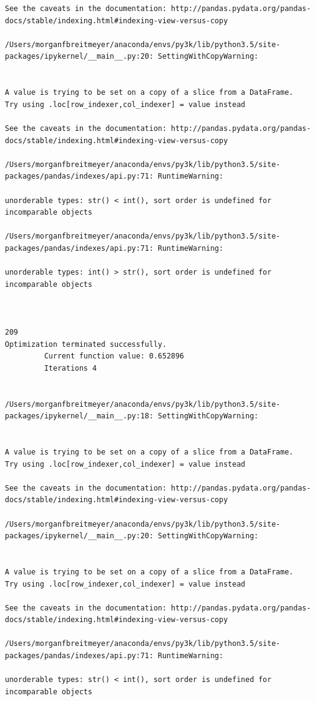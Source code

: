\begin{lstlisting}
See the caveats in the documentation: http://pandas.pydata.org/pandas-docs/stable/indexing.html#indexing-view-versus-copy

/Users/morganfbreitmeyer/anaconda/envs/py3k/lib/python3.5/site-packages/ipykernel/__main__.py:20: SettingWithCopyWarning:


A value is trying to be set on a copy of a slice from a DataFrame.
Try using .loc[row_indexer,col_indexer] = value instead

See the caveats in the documentation: http://pandas.pydata.org/pandas-docs/stable/indexing.html#indexing-view-versus-copy

/Users/morganfbreitmeyer/anaconda/envs/py3k/lib/python3.5/site-packages/pandas/indexes/api.py:71: RuntimeWarning:

unorderable types: str() < int(), sort order is undefined for incomparable objects

/Users/morganfbreitmeyer/anaconda/envs/py3k/lib/python3.5/site-packages/pandas/indexes/api.py:71: RuntimeWarning:

unorderable types: int() > str(), sort order is undefined for incomparable objects



209
Optimization terminated successfully.
         Current function value: 0.652896
         Iterations 4


/Users/morganfbreitmeyer/anaconda/envs/py3k/lib/python3.5/site-packages/ipykernel/__main__.py:18: SettingWithCopyWarning:


A value is trying to be set on a copy of a slice from a DataFrame.
Try using .loc[row_indexer,col_indexer] = value instead

See the caveats in the documentation: http://pandas.pydata.org/pandas-docs/stable/indexing.html#indexing-view-versus-copy

/Users/morganfbreitmeyer/anaconda/envs/py3k/lib/python3.5/site-packages/ipykernel/__main__.py:20: SettingWithCopyWarning:


A value is trying to be set on a copy of a slice from a DataFrame.
Try using .loc[row_indexer,col_indexer] = value instead

See the caveats in the documentation: http://pandas.pydata.org/pandas-docs/stable/indexing.html#indexing-view-versus-copy

/Users/morganfbreitmeyer/anaconda/envs/py3k/lib/python3.5/site-packages/pandas/indexes/api.py:71: RuntimeWarning:

unorderable types: str() < int(), sort order is undefined for incomparable objects


\end{lstlisting}
